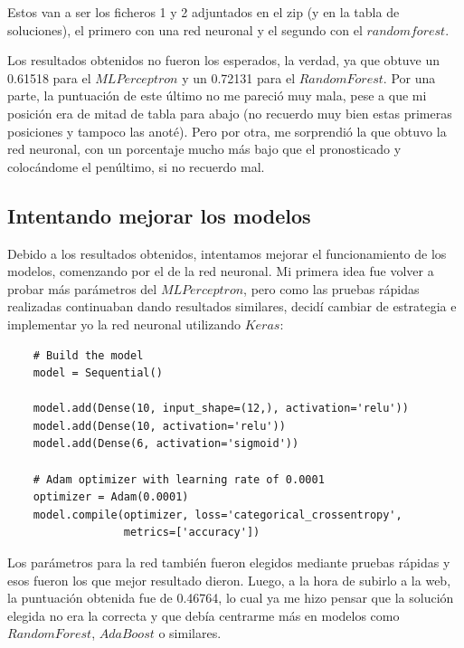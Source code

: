\documentclass[11pt,a4paper]{article}
\begin{document}
Estos van a ser los ficheros 1 y 2 adjuntados en el zip (y en la tabla de soluciones), el primero con una red neuronal y el segundo
con el $random forest$.

Los resultados obtenidos no fueron los esperados, la verdad, ya que obtuve un 0.61518 para el $MLPerceptron$ y un 0.72131 para el
$RandomForest$. Por una parte, la puntuación de este último no me pareció muy mala, pese a que mi posición era de mitad de tabla
para abajo (no recuerdo muy bien estas primeras posiciones y tampoco las anoté). Pero por otra, me sorprendió la que obtuvo la red
neuronal, con un porcentaje mucho más bajo que el pronosticado y colocándome el penúltimo, si no recuerdo mal.


\subsection{Intentando mejorar los modelos}

Debido a los resultados obtenidos, intentamos mejorar el funcionamiento de los modelos, comenzando por el de la red neuronal. Mi
primera idea fue volver a probar más parámetros del $MLPerceptron$, pero como las pruebas rápidas realizadas continuaban dando
resultados similares, decidí cambiar de estrategia e implementar yo la red neuronal utilizando $Keras$:

\label{rn}
\begin{lstlisting}
    # Build the model
    model = Sequential()

    model.add(Dense(10, input_shape=(12,), activation='relu'))
    model.add(Dense(10, activation='relu'))
    model.add(Dense(6, activation='sigmoid'))

    # Adam optimizer with learning rate of 0.0001
    optimizer = Adam(0.0001)
    model.compile(optimizer, loss='categorical_crossentropy',
                  metrics=['accuracy'])

\end{lstlisting}

Los parámetros para la red también fueron elegidos mediante pruebas rápidas y esos fueron los que mejor resultado dieron. Luego,
a la hora de subirlo a la web, la puntuación obtenida fue de 0.46764, lo cual ya me hizo pensar que la solución elegida no era
la correcta y que debía centrarme más en modelos como $RandomForest$, $AdaBoost$ o similares.
\end{document}

